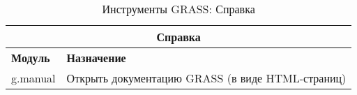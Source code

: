 {\renewcommand{\arraystretch}{0.7}
\begin{table}[H]
\centering
 \begin{tabular}{|p{4cm}|p{11cm}|}
  \hline \multicolumn{2}{|c|}{\textbf{Справка}} \\
  \hline \textbf{Модуль} & \textbf{Назначение} \\
  \hline g.manual & Открыть документацию GRASS (в виде HTML-страниц) \\
\hline
\end{tabular}
\caption{Инструменты GRASS: Справка}
\end{table}}

